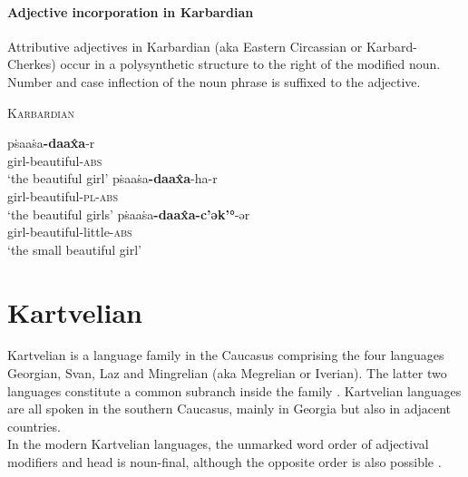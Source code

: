 \paragraph{Adjective incorporation in Karbardian}
Attributive adjectives in Karbardian (aka Eastern Circassian or Karbard-Cherkes) occur in a polysynthetic structure to the right of the modified noun. Number and case inflection of the noun phrase is suffixed to the adjective.
\begin{exe}
\ex \textsc{Karbardian} \citep[295]{colarusso1989}
\begin{xlist}
\ex	
\gll	pṡaaṡa\textbf{-daax̂a}-r\\
	girl-beautiful-\textsc{abs}\\
\glt	‘the beautiful girl’
\ex
\gll	pṡaaṡa\textbf{-daax̂a}-ha-r\\
	girl-beautiful-\textsc{pl}-\textsc{abs}\\
\glt	‘the beautiful girls’
\ex
\gll	pṡaaṡa\textbf{-daax̂a-c'ək'°}-ər\\
	girl-beautiful-little-\textsc{abs}\\
\glt	‘the small beautiful girl’
\end{xlist}
\end{exe}

\section{Kartvelian}\label{kartvelian synchr}
Kartvelian is a language family in the Caucasus comprising the four languages Georgian, Svan, Laz and Mingrelian (aka Megrelian or Iverian). The latter two languages constitute a common subranch inside the family \cite[220]{salminen2007}. Kartvelian languages are all spoken in the southern Caucasus, mainly in Georgia but also in adjacent countries.\\

\noindent In the modern Kartvelian languages, the unmarked word order of adjectival modifiers and head is noun-final, although the opposite order is also possible \citep[56]{harris1991a}.\\

